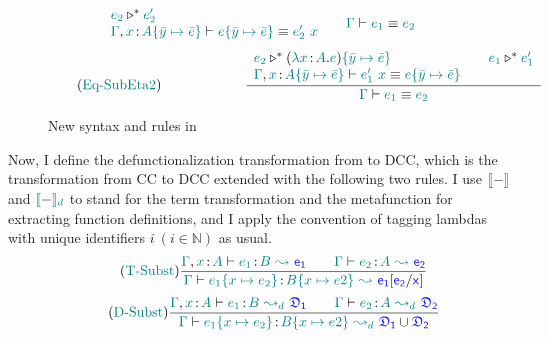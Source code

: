 \begin{figure}
\begin{equation}
{\begin{array}{l @{\qquad} l}
			 \helper{e_2} \triangleright^* \helper{e_2'}\\
			 \helper{\Gamma}, \helper{x} \goodcolon \helper{A}\hsub{\bar{e}}{\bar{y}} \vdash \helper{e\hsub{\bar{e}}{\bar{y}}} \equiv \helper{e_2'}\ \helper{x}
			 \end{array}
			 }
			{\helper{\Gamma} \vdash \helper{e_1} \equiv \helper{e_2}}
	\end{equation}
	\begin{equation}
		\tag{\helper{Eq-SubEta2}}
		\qquad\qquad\qquad
		\frac
			{\begin{array}{l @{\qquad} l}
			 \helper{e_2} \triangleright^* (\helper{\lambda x} \goodcolon \helper{A} . \helper{e})\helper{\hsub{\bar{e}}{\bar{y}}} &
			 \helper{e_1} \triangleright^* \helper{e_1'} \\
			 \helper{\Gamma}, \helper{x} \goodcolon \helper{A}\hsub{\bar{e}}{\bar{y}} \vdash \helper{e_1'}\ \helper{x} \equiv \helper{e\hsub{\bar{e}}{\bar{y}}}
			 \end{array}
			 }
			{\helper{\Gamma} \vdash \helper{e_1} \equiv \helper{e_2}}
	\end{equation}
\label{fig: ccs}
\caption{New syntax and rules in {\ccs}}
\end{figure}

Now, I define the defunctionalization transformation from {\ccs} to DCC, which is the transformation from CC to DCC extended with the following two rules. I use $\color{teal}{[\![}\color{black}{-}\color{teal}{]\!]}\color{black}$ and $\color{teal}{[\![}\color{black}{-}\color{teal}{]\!]_d}\color{black}$ to stand for the term transformation and the metafunction for extracting function definitions, and I apply the convention of tagging lambdas with unique identifiers $i\ (i \in \mathbb{N})$ as usual.
\begin{equation}
	\tag{\helper{T-Subst}}
	\frac
		{\helper{\Gamma}, \helper{x} \goodcolon \helper{A} \vdash \helper{e_1} \goodcolon \helper{B} \ \helper{\leadsto}\ 
		 \target{e_1} \qquad
		 \helper{\Gamma} \vdash \helper{e_2} \goodcolon \helper{A}\ \helper{\leadsto}\ \target{e_2}
		}
		{
		 \helper{\Gamma} \vdash \helper{e_1\hsub{e_2}{x}} \goodcolon \helper{B\hsub{e2}{x}}\ \helper{\leadsto}\
		 \target{e_1}\targetsub{e_2}{x}
		}
\end{equation}
\begin{equation}
	\tag{\helper{D-Subst}}
	\frac
		{\helper{\Gamma}, \helper{x} \goodcolon \helper{A} \vdash \helper{e_1} \goodcolon \helper{B} \ \helper{\leadsto_d}\ 
		 \target{\fdef_1} \qquad
		 \helper{\Gamma} \vdash \helper{e_2} \goodcolon \helper{A}\ \helper{\leadsto_d}\ \target{\fdef_2}
		}
		{
		 \helper{\Gamma} \vdash \helper{e_1\hsub{e_2}{x}} \goodcolon \helper{B\hsub{e2}{x}}\ \helper{\leadsto_d}\
		 \target{\fdef_{1}} \cup \target{\fdef_2}
		}
\end{equation}

